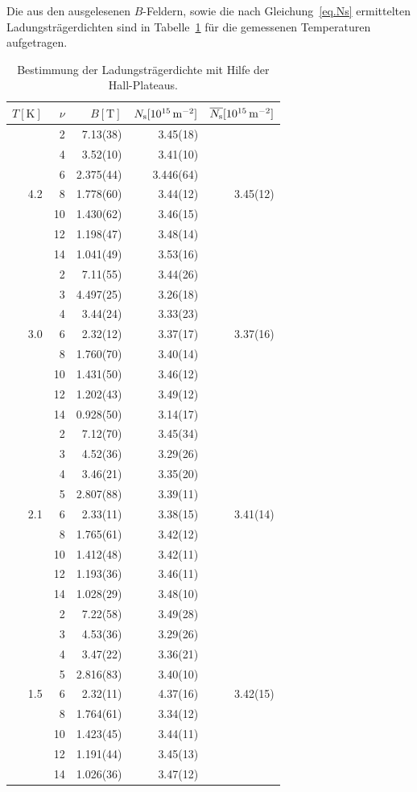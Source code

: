 \documentclass[paper=a4,fontsize=10pt,DIV=18,twocolumn,parskip=half]{scrartcl}
\numberwithin{equation}{section}    %
\newcommand{\kor}[1]{{\color{darkgreen}#1}}
\begin{document}
Die aus den ausgelesenen $B$-Feldern, sowie die nach Gleichung~\eqref{eq.Ns} ermittelten Ladungsträgerdichten sind in Tabelle~\ref{ladungstraegerdichte2} für die gemessenen Temperaturen aufgetragen.
\begin{table}[htp]
	\begin{center}
	\kor{\begin{tabular}{r|rrr|r}
		\hline
			$T[\mathrm{K}]$ & $\nu$ & $B[\mathrm{T}]$ & $N_{\rm s}[10^{15}\,\mathrm{m}^{-2}]$ & $\overline{N_{\rm s}}[10^{15}\,\mathrm{m}^{-2}]$\\
		\hline
			 &  2 & 7.13(38) & 3.45(18)&\\
			 &  4 & 3.52(10) & 3.41(10)&\\
			 &  6 & 2.375(44) & 3.446(64)&\\
			4.2 &  8 & 1.778(60) & 3.44(12)& 3.45(12)\\
			 & 10 & 1.430(62) & 3.46(15)&\\
			 & 12 & 1.198(47) & 3.48(14)&\\
			 & 14 & 1.041(49) & 3.53(16)&\\
			\hline
			 &  2 & 7.11(55) & 3.44(26)&\\
			 &  3 & 4.497(25) & 3.26(18)&\\
			 &  4 & 3.44(24) & 3.33(23)&\\
			3.0 &  6 & 2.32(12) & 3.37(17)& 3.37(16)\\
			 &  8 & 1.760(70) & 3.40(14)&\\
			 & 10 & 1.431(50) & 3.46(12)&\\
			 & 12 & 1.202(43) & 3.49(12)&\\
			 & 14 & 0.928(50) & 3.14(17)&\\
			\hline
			 &  2 & 7.12(70) & 3.45(34)&\\
			 &  3 & 4.52(36) & 3.29(26)&\\
			 &  4 & 3.46(21) & 3.35(20)&\\
			 &  5 & 2.807(88) & 3.39(11)&\\
			2.1 &  6 & 2.33(11) & 3.38(15)& 3.41(14)\\
			 &  8 & 1.765(61) & 3.42(12)&\\
			 & 10 & 1.412(48) & 3.42(11)&\\
			 & 12 & 1.193(36) & 3.46(11)&\\
			 & 14 & 1.028(29) & 3.48(10)&\\
			\hline
			 &  2 & 7.22(58) & 3.49(28)&\\
			 &  3 & 4.53(36) & 3.29(26)&\\
			 &  4 & 3.47(22) & 3.36(21)&\\
			 &  5 & 2.816(83) & 3.40(10)&\\
			1.5 &  6 & 2.32(11) & 4.37(16)& 3.42(15)\\
			 &  8 & 1.764(61) & 3.34(12)&\\
			 & 10 & 1.423(45) & 3.44(11)&\\
			 & 12 & 1.191(44) & 3.45(13)&\\
			 & 14 & 1.026(36) & 3.47(12)&\\
		\hline	
	\end{tabular}}
	\caption{Bestimmung der Ladungsträgerdichte mit Hilfe der Hall-Plateaus.}
	\label{ladungstraegerdichte2}
	\end{center}
\end{table}
\end{document}
